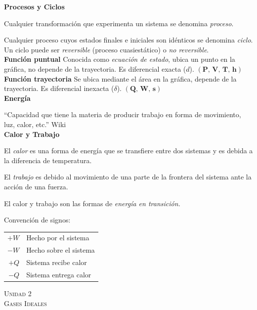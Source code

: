 \documentclass[11pt,a4paper,twocolumn]{article}
\newcommand{\unidad}[2]{\begin{center}
		\fontsize{10}{10}\selectfont\color{gray!50!black}\scshape Unidad #1 \\
		\fontsize{14}{14}\selectfont \scshape #2
\end{center}}
\begin{document}
\textbf{Procesos y Ciclos}

Cualquier transformación que experimenta un sistema se denomina \emph{proceso}.

Cualquier proceso cuyos estados finales e iniciales son idénticos se denomina \emph{ciclo}. Un ciclo puede ser \emph{reversible} (proceso cuasiestático) o \emph{no reversible}. \\

\textbf{Función puntual}
Conocida como \emph{ecuación de estado}, ubica un punto en la gráfica, no depende de la trayectoria. Es diferencial exacta ($d$). $(\textbf{P, V, T, h})$ \\

\textbf{Función trayectoria}
Se ubica mediante el área en la gráfica, depende de la trayectoria. Es diferencial inexacta ($\delta$). $(\textbf{Q, W, s})$ \\

\textbf{Energía}

``Capacidad que tiene la materia de producir trabajo en forma de movimiento, luz, calor, etc.'' Wiki\\

	\textbf{Calor y Trabajo}
	
	El \emph{calor} es una forma de energía que se transfiere entre dos sistemas y es debida a la diferencia de temperatura.
	
	El \emph{trabajo} es debido al movimiento de una parte de la frontera del sistema ante la acción de una fuerza.
	
	El calor y trabajo son las formas de \emph{energía en transición.}
	
	Convención de signos:
	
	\begin{center}
		\begin{tabular}{r | l}     \vspace{.2cm}
		$+W$ & Hecho por el sistema \\ \vspace{.2cm}
		$-W$ & Hecho sobre el sistema\\ \vspace{.2cm}
		$+Q$ & Sistema recibe calor \\ \vspace{.2cm}
		$-Q$ & Sistema entrega calor \\
	\end{tabular}
	\end{center}
	
	
	\unidad{2}{Gases Ideales}
\end{document}
